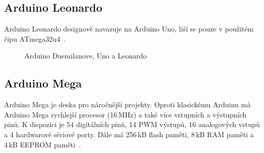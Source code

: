 		\subsection{Arduino Leonardo} 
		Arduino Leonardo designově navazuje na Arduino Uno, liší se pouze v použitém čipu ATmega32u4~\cite{ArduinoLeonardo}.


\begin{figure}[!ht]
    \centering
			\hspace*{5mm}
			\hspace*{5mm}
    \caption{Arduino Duemilanove, Uno a Leonardo}
\end{figure}


\newpage
	
					\subsection{Arduino Mega} 
					Arduino Mega je deska pro náročnější projekty. Oproti klasickému Arduinu má Arduino Mega rychlejší procesor (16\,MHz) a také více vstupních a výstupních pinů. K dispozici je 54 digitálních pinů, 14 PWM výstupů, 16 analogových vstupů a 4 hardwarové sériové porty. Dále má 256\,kB flash paměti, 8\,kB RAM paměti a 4\,kB EEPROM paměti~\cite{ArduinoMega}.	
			
